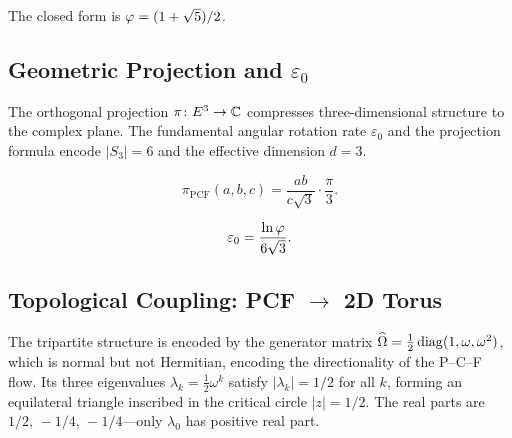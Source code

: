 \begin{Remark}
The closed form is $\varphi = (1+\sqrt{5})/2$.
\end{Remark}


\subsection{Geometric Projection and \texorpdfstring{$\varepsilon_0$}{epsilon_0}}\label{ssec:projection}

The orthogonal projection $\pi\colon E^3\to\mathbb{C}$ compresses
three-dimensional structure to the complex plane.  The fundamental angular
rotation rate $\varepsilon_0$ and the projection formula encode $|S_3|=6$ and
the effective dimension $d=3$.

\begin{Definition}\label{def:projection}
\begin{equation}\label{eq:projection-pcf}
  \pi_{\mathrm{PCF}}(a,b,c) = \frac{ab}{c\sqrt{3}}
    \cdot\frac{\pi}{3}.
\end{equation}
\end{Definition}

\begin{Definition}\label{def:epsilon0}
\begin{equation}\label{eq:epsilon0}
  \varepsilon_0 = \frac{\ln\varphi}{6\sqrt{3}}.
\end{equation}
\end{Definition}


\subsection{Topological Coupling: PCF \texorpdfstring{$\to$}{to} 2D Torus}\label{ssec:torus}

The tripartite structure is encoded by the generator matrix
$\widehat{\Omega} = \tfrac{1}{2}\,\mathrm{diag}(1,\omega,\omega^2)$, which is normal
but not Hermitian, encoding the directionality of the P--C--F flow.  Its
three eigenvalues $\lambda_k = \tfrac{1}{2}\omega^k$ satisfy
$|\lambda_k|=1/2$ for all $k$, forming an equilateral triangle inscribed in
the critical circle $|z|=1/2$.  The real parts are
$1/2,\,-1/4,\,-1/4$---only $\lambda_0$ has positive real part.

